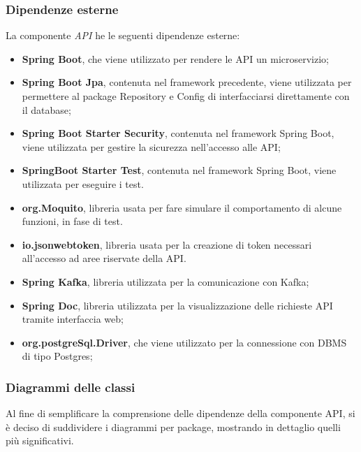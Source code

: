 	\subsubsection{Dipendenze esterne}
		La componente \textit{API} he le seguenti dipendenze esterne:
		\begin{itemize}
			\item \textbf{Spring Boot}, che viene utilizzato per rendere le API un microservizio; 
			\item \textbf{Spring Boot Jpa}, contenuta nel framework precedente, viene utilizzata per permettere al package Repository e Config di interfacciarsi direttamente con il database;
			\item \textbf{Spring Boot Starter Security}, contenuta nel framework Spring Boot, viene utilizzata per gestire la sicurezza nell'accesso alle API;
			\item \textbf{SpringBoot Starter Test}, contenuta nel framework Spring Boot, viene utilizzata per eseguire i test.
			\item \textbf{org.Moquito}, libreria usata per fare simulare il comportamento di alcune funzioni, in fase di test.
			\item \textbf{io.jsonwebtoken}, libreria usata per la creazione di token necessari all'accesso ad aree riservate della API.
			\item \textbf{Spring Kafka}, libreria utilizzata per la comunicazione con Kafka;
			\item \textbf{Spring Doc}, libreria utilizzata per la visualizzazione delle richieste API tramite interfaccia web;
			\item \textbf{org.postgreSql.Driver}, che viene utilizzato per la connessione con DBMS di tipo Postgres; 
		\end{itemize}

	\subsubsection{Diagrammi delle classi}
		Al fine di semplificare la comprensione delle dipendenze della componente API, si è deciso di suddividere i diagrammi per package, mostrando in dettaglio quelli più significativi.

